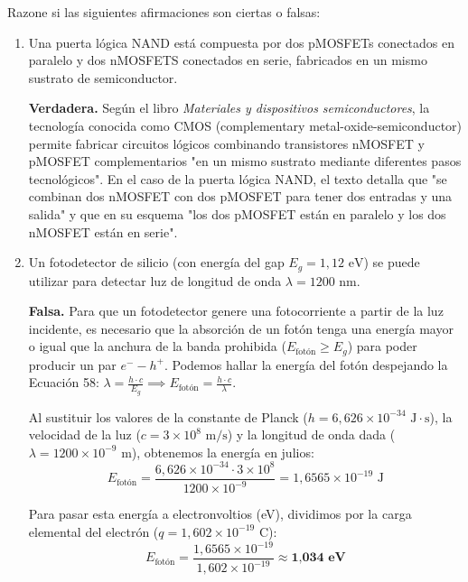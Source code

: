 \documentclass[11pt, a4paper]{article}
\newenvironment{problem}[1][Cuestión]{
	\vspace{0.5cm}
	\noindent{\Large\bfseries #1} \par\vspace{0.5cm}
}{
	\vspace{0.5cm}
}
\begin{document}
	\begin{problem}[Cuestión 6]
		Razone si las siguientes afirmaciones son ciertas o falsas:

		\begin{enumerate}[label=\alph*)] 
			\item Una puerta lógica NAND está compuesta por dos pMOSFETs conectados en paralelo y dos nMOSFETS conectados en serie, fabricados en un mismo sustrato de semiconductor.

				{ \color{blue} 
					\textbf{Verdadera.} Según el libro \textit{Materiales y dispositivos semiconductores}, la tecnología conocida como CMOS (complementary metal-oxide-semiconductor) permite fabricar circuitos lógicos combinando transistores nMOSFET y pMOSFET complementarios "en un mismo sustrato mediante diferentes pasos tecnológicos". En el caso de la puerta lógica NAND, el texto detalla que "se combinan dos nMOSFET con dos pMOSFET para tener dos entradas y una salida" y que en su esquema "los dos pMOSFET están en paralelo y los dos nMOSFET están en serie".
				}

			\item Un fotodetector de silicio (con energía del gap $E_g = 1,12 \text{ eV}$) se puede utilizar para detectar luz de longitud de onda $\lambda = 1200 \text{ nm}$.

				{ \color{blue} 
					\textbf{Falsa.} Para que un fotodetector genere una fotocorriente a partir de la luz incidente, es necesario que la absorción de un fotón tenga una energía mayor o igual que la anchura de la banda prohibida ($E_{\text{fotón}} \ge E_g$) para poder producir un par $e^- - h^+$. Podemos hallar la energía del fotón despejando la Ecuación 58: $\lambda = \frac{h \cdot c}{E_g} \implies E_{\text{fotón}} = \frac{h \cdot c}{\lambda}$. 

					Al sustituir los valores de la constante de Planck ($h = 6,626 \times 10^{-34} \text{ J}\cdot\text{s}$), la velocidad de la luz ($c = 3 \times 10^8 \text{ m/s}$) y la longitud de onda dada ($\lambda = 1200 \times 10^{-9} \text{ m}$), obtenemos la energía en julios:
					\begin{equation*}
						E_{\text{fotón}} = \frac{6,626 \times 10^{-34} \cdot 3 \times 10^8}{1200 \times 10^{-9}} = 1,6565 \times 10^{-19} \text{ J}
					\end{equation*}

					Para pasar esta energía a electronvoltios (eV), dividimos por la carga elemental del electrón ($q = 1,602 \times 10^{-19} \text{ C}$):
					\begin{equation*}
						E_{\text{fotón}} = \frac{1,6565 \times 10^{-19}}{1,602 \times 10^{-19}} \approx \textbf{1,034 eV}
					\end{equation*}

}
\end{enumerate}
\end{problem}
\end{document}
